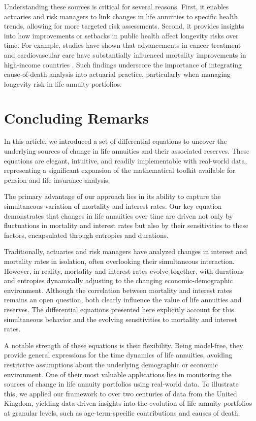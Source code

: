 \documentclass[12pt]{article}
\begin{document}
Understanding these sources is critical for several reasons. First, it enables actuaries and risk managers to link changes in life annuities to specific health trends, allowing for more targeted risk assessments. Second, it provides insights into how improvements or setbacks in public health affect longevity risks over time. For example, studies have shown that advancements in cancer treatment and cardiovascular care have substantially influenced mortality improvements in high-income countries \citet{weber2023gains}. Such findings underscore the importance of integrating cause-of-death analysis into actuarial practice, particularly when managing longevity risk in life annuity portfolios.


\section{Concluding Remarks}\label{sec:6_Conclusion}

In this article, we introduced a set of differential equations to uncover the underlying sources of change in life annuities and their associated reserves. These equations are elegant, intuitive, and readily implementable with real-world data, representing a significant expansion of the mathematical toolkit available for pension and life insurance analysis.

The primary advantage of our approach lies in its ability to capture the simultaneous variation of mortality and interest rates. Our key equation demonstrates that changes in life annuities over time are driven not only by fluctuations in mortality and interest rates but also by their sensitivities to these factors, encapsulated through entropies and durations.

Traditionally, actuaries and risk managers have analyzed changes in interest and mortality rates in isolation, often overlooking their simultaneous interaction. However, in reality, mortality and interest rates evolve together, with durations and entropies dynamically adjusting to the changing economic-demographic environment. Although the correlation between mortality and interest rates remains an open question, both clearly influence the value of life annuities and reserves. The differential equations presented here explicitly account for this simultaneous behavior and the evolving sensitivities to mortality and interest rates.

A notable strength of these equations is their flexibility. Being model-free, they provide general expressions for the time dynamics of life annuities, avoiding restrictive assumptions about the underlying demographic or economic environment. One of their most valuable applications lies in monitoring the sources of change in life annuity portfolios using real-world data. To illustrate this, we applied our framework to over two centuries of data from the United Kingdom, yielding data-driven insights into the evolution of life annuity portfolios at granular levels, such as age-term-specific contributions and causes of death.
\end{document}
